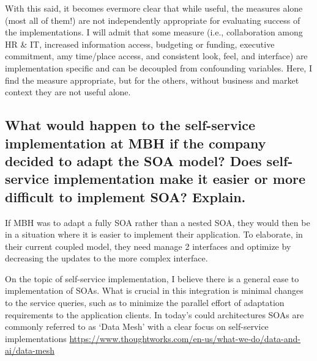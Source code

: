 \documentclass{article}
\begin{document}
With this said, it becomes evermore clear that while useful, the measures alone (most all of them!) are not independently appropriate for evaluating success of the implementations.
I will admit that some measure (i.e., collaboration among HR \& IT, increased information access, budgeting or funding, executive commitment, amy time/place access, and consistent look, feel, and interface) are implementation specific and can be decoupled from confounding variables.
Here, I find the measure appropriate, but for the others, without business and market context they are not useful alone.

\subsection{What would happen to the self-service implementation at MBH if the company decided to adapt the SOA model? Does self-service implementation make it easier or more difficult to implement SOA? Explain.}
If MBH was to adapt a fully SOA rather than a nested SOA, they would then be in a situation where it is easier to implement their application.
To elaborate, in their current coupled model, they need manage 2 interfaces and optimize by decreasing the updates to the more complex interface.

On the topic of self-service implementation, I believe there is a general ease to implementation of SOAs.
What is crucial in this integration is minimal changes to the service queries, such as to minimize the parallel effort of adaptation requirements to the application clients.
In today's could architectures SOAs are commonly referred to as `Data Mesh' with a clear focus on self-service implementations \url{https://www.thoughtworks.com/en-us/what-we-do/data-and-ai/data-mesh}






\end{document}
